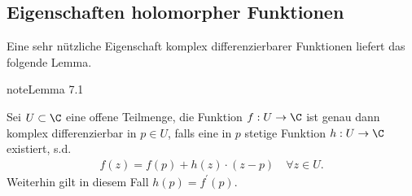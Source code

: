 \documentclass[letterpaper,10pt,german]{jupyterBook}
\begin{document}
\subsection{Eigenschaften holomorpher Funktionen}
\label{\detokenize{complexanalysis/cauchyriemann:eigenschaften-holomorpher-funktionen}}
\sphinxAtStartPar
Eine sehr nützliche Eigenschaft komplex differenzierbarer Funktionen liefert das folgende Lemma.
\label{complexanalysis/cauchyriemann:lem:splitholo}
\begin{sphinxadmonition}{note}{Lemma 7.1}



\sphinxAtStartPar
Sei \(U \subset \C\) eine offene Teilmenge, die Funktion \(f:U\to\C\) ist genau dann komplex differenzierbar in \(p\in U\), falls eine in \(p\) stetige Funktion \(h:U\to\C\) existiert, s.d.
\begin{equation*}
\begin{split}f(z) = f(p) + h(z)\cdot (z-p)\quad\forall z\in U.\end{split}
\end{equation*}
\sphinxAtStartPar
Weiterhin gilt in diesem Fall \(h(p) = f^\prime(p)\).
\end{sphinxadmonition}
\end{document}
